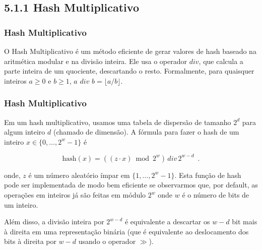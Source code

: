 \documentclass{beamer}
\begin{document}
\subsection{5.1.1 Hash Multiplicativo}
\begin{frame}
\frametitle{Hash Multiplicativo}
O Hash Multiplicativo é um método eficiente de gerar valores de hash baseado na aritmética modular e na divisão inteira. Ele usa o operador $ div $, que calcula a parte inteira de um quociente, descartando o resto. Formalmente, para quaisquer inteiros $ a\ge 0$ e $ b\ge 1$, $ a$ $div$ $b = \lfloor a/b\rfloor$. 
\end{frame}

\begin{frame}
\frametitle{Hash Multiplicativo}
 Em um hash multiplicativo, usamos uma tabela de dispersão de tamanho $ 2^{\ensuremath{\ensuremath{d}}}$ para algum inteiro $ \ensuremath{d}$ (chamado de dimensão). A fórmula para fazer o hash de um inteiro $ \ensuremath{\ensuremath{x}}\in\{0,\ldots,2^w-1\}$ é

\[
    \ensuremath{\ensuremath{\mathrm{hash}(x)}} = ((\ensuremath{\ensuremath{z}}\cdot\ensuremath{\ensuremath{x}}) \bmod 2^w)\, div\, 2^{\ensuremath{\ensuremath{w}}-\ensuremath{\ensuremath{d}}} \enspace.
\]


onde, $ \ensuremath{z}$ é um número aleatório ímpar em $ \{1,\ldots,2^w-1\}$. Esta função de hash pode ser implementada de modo bem eficiente se observarmos que, por default, as operações em inteiros já são feitas em módulo $2^w$ onde $\ensuremath{\ensuremath{w}}$ é o número de bits de um inteiro. 

Além disso, a divisão inteira por $ 2^{\ensuremath{\ensuremath{w}}-\ensuremath{\ensuremath{d}}}$ é equivalente a descartar os  $ \ensuremath{\ensuremath{w}}-\ensuremath{\ensuremath{d}}$ bit mais à direita em uma representação binária (que é equivalente ao deslocamento dos bits à direita por $ \ensuremath{\ensuremath{w}}-\ensuremath{\ensuremath{d}}$ usando o operador $ \ensuremath{\gg}$). 
\end{frame}
\end{document}
